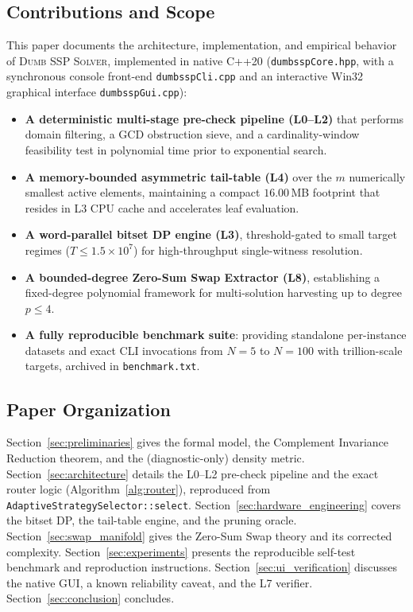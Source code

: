 \documentclass[journal,onecolumn,11pt]{IEEEtran}
\begin{document}
\subsection{Contributions and Scope}
This paper documents the architecture, implementation, and empirical behavior of \textsc{Dumb SSP Solver}, implemented in native C++20 (\texttt{dumbsspCore.hpp}, with a synchronous console front-end \texttt{dumbsspCli.cpp} and an interactive Win32 graphical interface \texttt{dumbsspGui.cpp}):
\begin{itemize}
    \item \textbf{A deterministic multi-stage pre-check pipeline (L0--L2)} that performs domain filtering, a GCD obstruction sieve, and a cardinality-window feasibility test in polynomial time prior to exponential search.
    \item \textbf{A memory-bounded asymmetric tail-table (L4)} over the $m$ numerically smallest active elements, maintaining a compact $16.00$\,MB footprint that resides in L3 CPU cache and accelerates leaf evaluation.
    \item \textbf{A word-parallel bitset DP engine (L3)}, threshold-gated to small target regimes ($T \le 1.5\times10^7$) for high-throughput single-witness resolution.
    \item \textbf{A bounded-degree Zero-Sum Swap Extractor (L8)}, establishing a fixed-degree polynomial framework for multi-solution harvesting up to degree $p \le 4$.
    \item \textbf{A fully reproducible benchmark suite}: providing standalone per-instance datasets and exact CLI invocations from $N=5$ to $N=100$ with trillion-scale targets, archived in \texttt{benchmark.txt}.
\end{itemize}

\subsection{Paper Organization}
Section~\ref{sec:preliminaries} gives the formal model, the Complement Invariance Reduction theorem, and the (diagnostic-only) density metric. Section~\ref{sec:architecture} details the L0--L2 pre-check pipeline and the exact router logic (Algorithm~\ref{alg:router}), reproduced from \texttt{AdaptiveStrategySelector::select}. Section~\ref{sec:hardware_engineering} covers the bitset DP, the tail-table engine, and the pruning oracle. Section~\ref{sec:swap_manifold} gives the Zero-Sum Swap theory and its corrected complexity. Section~\ref{sec:experiments} presents the reproducible self-test benchmark and reproduction instructions. Section~\ref{sec:ui_verification} discusses the native GUI, a known reliability caveat, and the L7 verifier. Section~\ref{sec:conclusion} concludes.
\end{document}

